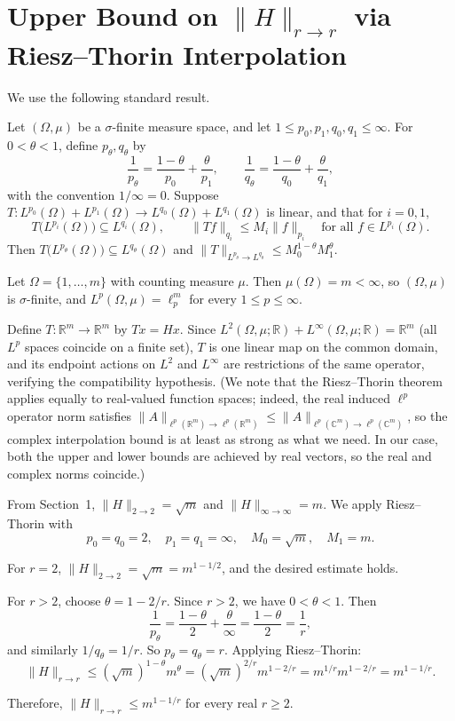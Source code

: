 \section{Upper Bound on $\|H\|_{r \to r}$ via Riesz--Thorin Interpolation}

We use the following standard result.

\begin{theorem}
Let $(\Omega,\mu)$ be a $\sigma$-finite measure space, and let $1\le p_0,p_1,q_0,q_1\le \infty$. For $0<\theta<1$, define $p_\theta,q_\theta$ by
\[
\frac1{p_\theta} = \frac{1-\theta}{p_0} + \frac{\theta}{p_1}, \qquad \frac1{q_\theta} = \frac{1-\theta}{q_0} + \frac{\theta}{q_1},
\]
with the convention $1/\infty=0$. Suppose $T:L^{p_0}(\Omega)+L^{p_1}(\Omega)\to L^{q_0}(\Omega)+L^{q_1}(\Omega)$ is linear, and that for $i=0,1$,
\[
T\bigl(L^{p_i}(\Omega)\bigr)\subseteq L^{q_i}(\Omega), \qquad \|Tf\|_{q_i}\le M_i\|f\|_{p_i} \quad\text{for all }f\in L^{p_i}(\Omega).
\]
Then $T\bigl(L^{p_\theta}(\Omega)\bigr)\subseteq L^{q_\theta}(\Omega)$ and $\|T\|_{L^{p_\theta}\to L^{q_\theta}} \le M_0^{1-\theta}M_1^\theta$.
\end{theorem}

Let $\Omega=\{1,\dots,m\}$ with counting measure $\mu$. Then $\mu(\Omega)=m<\infty$, so $(\Omega,\mu)$ is $\sigma$-finite, and $L^p(\Omega,\mu)=\ell_p^m$ for every $1\le p\le \infty$.

Define $T:\mathbb{R}^m\to \mathbb{R}^m$ by $Tx=Hx$. Since $L^2(\Omega,\mu;\mathbb{R})+L^\infty(\Omega,\mu;\mathbb{R})=\mathbb{R}^m$ (all $L^p$ spaces coincide on a finite set), $T$ is one linear map on the common domain, and its endpoint actions on $L^2$ and $L^\infty$ are restrictions of the same operator, verifying the compatibility hypothesis. (We note that the Riesz--Thorin theorem applies equally to real-valued function spaces; indeed, the real induced $\ell^p$ operator norm satisfies $\|A\|_{\ell^p(\mathbb{R}^m)\to\ell^p(\mathbb{R}^m)}\leq \|A\|_{\ell^p(\mathbb{C}^m)\to\ell^p(\mathbb{C}^m)}$, so the complex interpolation bound is at least as strong as what we need. In our case, both the upper and lower bounds are achieved by real vectors, so the real and complex norms coincide.)

From Section~1, $\|H\|_{2\to 2}=\sqrt{m}$ and $\|H\|_{\infty\to\infty}=m$. We apply Riesz--Thorin with
\[
p_0=q_0=2, \quad p_1=q_1=\infty, \quad M_0=\sqrt{m}, \quad M_1=m.
\]

For $r=2$, $\|H\|_{2\to 2}=\sqrt{m}=m^{1-1/2}$, and the desired estimate holds.

For $r>2$, choose $\theta=1-2/r$. Since $r>2$, we have $0<\theta<1$. Then
\[
\frac{1}{p_\theta} = \frac{1-\theta}{2} + \frac{\theta}{\infty} = \frac{1-\theta}{2} = \frac{1}{r},
\]
and similarly $1/q_\theta = 1/r$. So $p_\theta = q_\theta = r$. Applying Riesz--Thorin:
\[
\|H\|_{r\to r} \le (\sqrt{m})^{1-\theta} m^\theta = (\sqrt{m})^{2/r} m^{1-2/r} = m^{1/r} m^{1-2/r} = m^{1-1/r}.
\]

Therefore, $\|H\|_{r\to r}\le m^{1-1/r}$ for every real $r\ge 2$.
